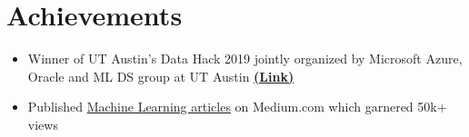 \documentclass[letterpaper,12pt, margin=2in]{article}
\newcommand{\resumeItem}[1]{
  \item\small{
    {#1 \vspace{-2pt}}
  }
}
\newcommand{\resumeSubHeadingListStart}{\begin{itemize}[leftmargin=0.05in, label={}]}
\newcommand{\resumeSubHeadingListEnd}{\end{itemize}}
\newcommand{\resumeItemListStart}{\begin{itemize}}
\newcommand{\resumeItemListEnd}{\end{itemize}\vspace{-8pt}}
\begin{document}
\section{Achievements}
    \resumeSubHeadingListStart
          \resumeItemListStart
            \resumeItem{Winner of UT Austin’s Data Hack 2019 jointly organized by Microsoft Azure, Oracle and ML DS group at UT Austin \href{https://devpost.com/software/austin-b-cycle}{\textbf{(Link)}}}
            \resumeItem{Published \href{https://medium.com/@animeshgoyal}{Machine Learning articles} on Medium.com which garnered 50k+ views}
          \resumeItemListEnd
    \resumeSubHeadingListEnd

%
\end{document}
